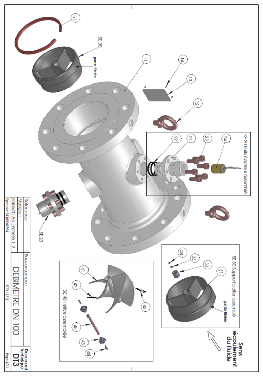 \documentclass[10pt,fleqn]{article} %
\begin{document}
\begin{center}
\includegraphics[width=\textwidth]{images/debitmetre_03}
\end{center}
\end{document}
